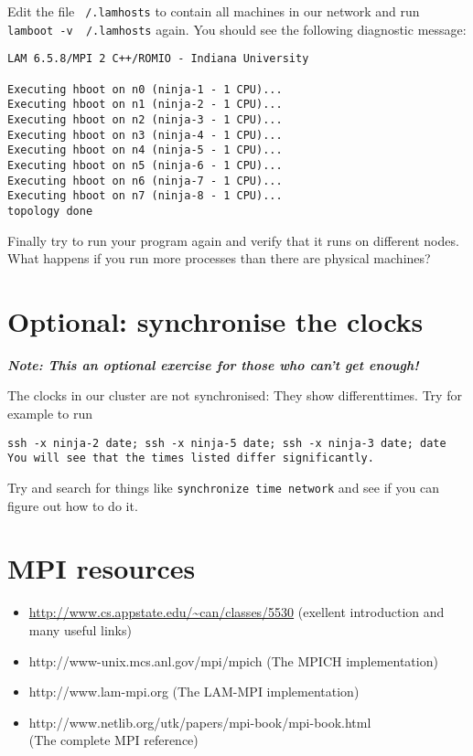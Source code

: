 \documentclass[12pt]{article}
\begin{document}
Edit the file \texttt{~/.lamhosts} to contain all machines in our network
and run \texttt{lamboot -v ~/.lamhosts} again. You should see the following
diagnostic message:
\begin{verbatim}
LAM 6.5.8/MPI 2 C++/ROMIO - Indiana University

Executing hboot on n0 (ninja-1 - 1 CPU)...
Executing hboot on n1 (ninja-2 - 1 CPU)...
Executing hboot on n2 (ninja-3 - 1 CPU)...
Executing hboot on n3 (ninja-4 - 1 CPU)...
Executing hboot on n4 (ninja-5 - 1 CPU)...
Executing hboot on n5 (ninja-6 - 1 CPU)...
Executing hboot on n6 (ninja-7 - 1 CPU)...
Executing hboot on n7 (ninja-8 - 1 CPU)...
topology done
\end{verbatim}
\noindent Finally try to run your program again and verify that it runs
on different nodes.
What happens if you run more processes than there are physical machines?


\section*{Optional: synchronise the clocks}

\textbf{\emph{Note: This an optional exercise for those who can't get enough!}}

The clocks in our cluster are not synchronised: They show differenttimes.
Try for example to run
\begin{verbatim}
ssh -x ninja-2 date; ssh -x ninja-5 date; ssh -x ninja-3 date; date
You will see that the times listed differ significantly.
\end{verbatim}

Try and search for things like
\texttt{synchronize time network}
and see if you can figure out how to do it.


\section*{MPI resources}

\begin{itemize}
  \item \url{http://www.cs.appstate.edu/~can/classes/5530} (exellent introduction
  and many useful links)
  \item http://www-unix.mcs.anl.gov/mpi/mpich (The MPICH implementation)
  \item http://www.lam-mpi.org (The LAM-MPI implementation)
  \item http://www.netlib.org/utk/papers/mpi-book/mpi-book.html\\
    (The complete MPI reference)
\end{itemize}
\end{document}
